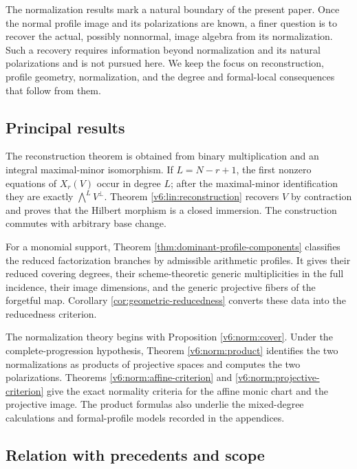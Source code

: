 \documentclass[10pt,fleqn]{article}
\numberwithin{equation}{section}
\begin{document}
The normalization results mark a natural boundary of the present paper.
Once the normal profile image and its polarizations are known, a finer
question is to recover the actual, possibly nonnormal, image algebra from its
normalization.  Such a recovery requires information beyond normalization and
its natural polarizations and is not pursued here.  We keep the focus on
reconstruction, profile geometry, normalization, and the degree and
formal-local consequences that follow from them.

\subsection{Principal results}

The reconstruction theorem is obtained from binary multiplication and an
integral maximal-minor isomorphism.  If \(L=N-r+1\), the first nonzero
equations of \(X_r(V)\) occur in degree \(L\); after the maximal-minor
identification they are exactly \(\bigwedge^L V^\perp\).  Theorem
\ref{v6:lin:reconstruction} recovers \(V\) by contraction and proves that the
Hilbert morphism is a closed immersion.  The construction commutes with
arbitrary base change.

For a monomial support, Theorem \ref{thm:dominant-profile-components}
classifies the reduced factorization branches by admissible arithmetic
profiles.  It gives their reduced covering degrees, their scheme-theoretic
generic multiplicities in the full incidence, their image dimensions, and
the generic projective fibers of the forgetful map.  Corollary
\ref{cor:geometric-reducedness} converts these data into the reducedness
criterion.

The normalization theory begins with Proposition \ref{v6:norm:cover}.  Under
the complete-progression hypothesis, Theorem \ref{v6:norm:product} identifies
the two normalizations as products of projective spaces and computes the two
polarizations.  Theorems \ref{v6:norm:affine-criterion} and
\ref{v6:norm:projective-criterion} give the exact normality criteria for the affine monic chart and the projective
image.  The product formulas also underlie the mixed-degree
calculations and formal-profile models recorded in the appendices.

\subsection{Relation with precedents and scope}
\end{document}
